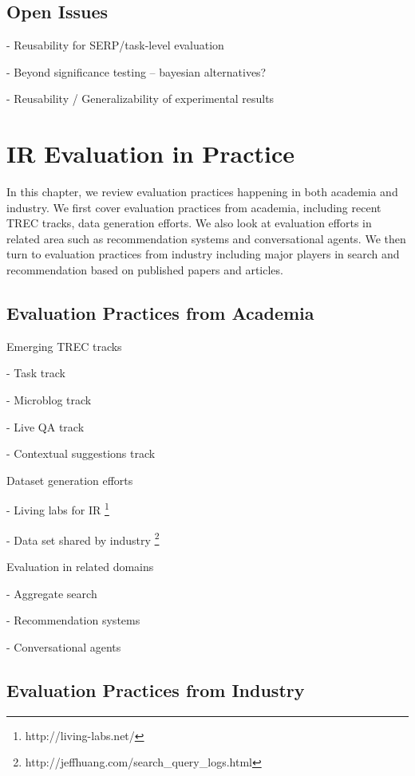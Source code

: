 \documentclass[openany]{now} %
\newcommand{\newpar}{\bigskip\noindent}
\begin{document}
\section{Open Issues}

- Reusability for SERP/task-level evaluation

- Beyond significance testing -- bayesian alternatives?

- Reusability / Generalizability of experimental results


\chapter{IR Evaluation in Practice}
\label{c-practice}

In this chapter, we review evaluation practices happening in both academia and industry. We first cover evaluation practices from academia, including recent TREC tracks, data generation efforts. We also look at evaluation efforts in related area such as recommendation systems and conversational agents. We then turn to evaluation practices from industry including major players in search and recommendation based on published papers and articles.

\section{Evaluation Practices from Academia}

Emerging TREC tracks

- Task track

- Microblog track

- Live QA track

- Contextual suggestions track

\newpar
Dataset generation efforts

- Living labs for IR \footnote{http://living-labs.net/}

- Data set shared by industry \footnote{http://jeffhuang.com/search\_query\_logs.html}

\newpar
Evaluation in related domains

- Aggregate search \cite{Zhou:2013}

- Recommendation systems \cite{gunawardana2015evaluating}

- Conversational agents

\section{Evaluation Practices from Industry}
\end{document}
